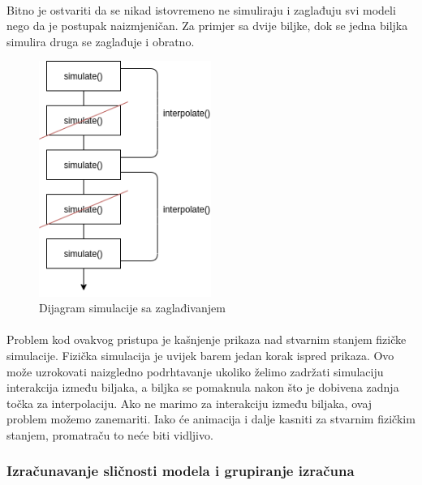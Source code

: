 \documentclass[times, utf8, diplomski]{fer}
\begin{document}
\paragraph{}
Bitno je ostvariti da se nikad istovremeno ne simuliraju i zaglađuju svi modeli 
nego da je postupak naizmjeničan. Za primjer sa dvije biljke, dok se jedna 
biljka simulira druga se zaglađuje i obratno.
\begin{figure}[h]
	\centering
	\includegraphics[width=0.5\textwidth]{img/531-2}
	\caption{Dijagram simulacije sa zaglađivanjem}
	\label{fig:531-2}
\end{figure}
\paragraph{}
Problem kod ovakvog pristupa je kašnjenje prikaza nad stvarnim stanjem fizičke 
simulacije. Fizička simulacija je uvijek barem jedan korak ispred prikaza. Ovo 
može uzrokovati naizgledno podrhtavanje ukoliko želimo zadržati simulaciju 
interakcija između biljaka, a biljka se pomaknula nakon što je dobivena zadnja 
točka za interpolaciju. Ako ne marimo za interakciju između biljaka, ovaj 
problem možemo zanemariti. Iako će animacija i dalje kasniti za stvarnim 
fizičkim stanjem, promatraču to neće biti vidljivo.
\subsubsection{Izračunavanje sličnosti modela i grupiranje izračuna}
\end{document}
